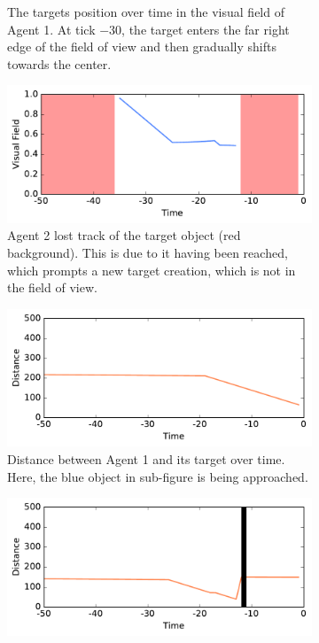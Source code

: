 \documentclass[journal]{journal}
\begin{document}
\begin{figure}
\begin{subfigure}{.49\columnwidth}
	\caption{The targets position over time in the visual field of Agent 1.
	At tick $-30$, the target enters the far right edge of the field of view and then gradually
	shifts towards the center.}
	\label{fig:experiment:pos1}
\end{subfigure}
\begin{subfigure}{.49\columnwidth}
	\center
	\includegraphics[width=.98\columnwidth]{img/1_235.pdf}
	\caption{Agent 2 lost track of the target object (red background).
	This is due to it having been reached, which prompts a new target creation, which is not in
	the field of view.}
	\label{fig:experiment:pos2}
\end{subfigure}
\begin{subfigure}{.49\columnwidth}
	\center
	\includegraphics[width=.98\columnwidth]{img/4_139.pdf}
	\caption{Distance between Agent 1 and its target over time.
	Here, the blue object in sub-figure  is being
	approached.}
	\label{fig:experiment:distance1}
\end{subfigure}
\begin{subfigure}{.49\columnwidth}
	\center
	\includegraphics[width=.98\columnwidth]{img/4_235.pdf}

\end{subfigure}
\end{figure}
\end{document}
